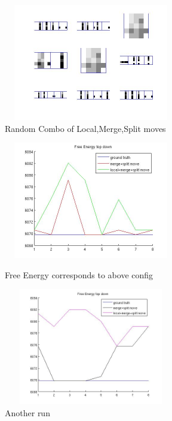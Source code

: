 \documentclass{article}
\begin{document}
\begin{spacing}{1.1}
\begin{enumerate}
\begin{figure}[h]
  \begin{minipage}[b]{0.5\textwidth} 
    \centering 
    \includegraphics[width=3in,height=2in]{td_lms.jpg} 
    \caption{Random Combo of Local,Merge,Split moves}
    \label{fig:by:table}  
   \end{minipage}%
\end{figure}

\begin{figure}[h] 
  \begin{minipage}[b]{0.5\textwidth} 
    \centering 
    \includegraphics[width=3in,height=2in]{tf_energy.jpg} 
    \caption{Free Energy corresponds to above config}
    \label{fig:by:table} 
  \end{minipage}%
  \begin{minipage}[b]{0.5\textwidth} 
    \centering 
    \includegraphics[width=3in,height=2in]{tf_energy2.jpg} 
    \caption{Another run}
    \label{fig:by:table}  
   \end{minipage}%
\end{figure}
\end{enumerate}

\end{spacing}
\end{document}
